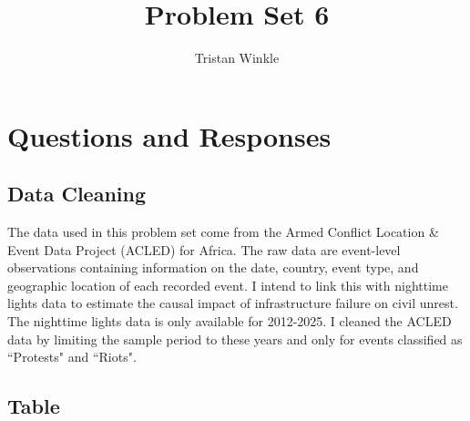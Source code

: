 \documentclass[12pt]{article}
\title{Problem Set 6}
\author{Tristan Winkle}
\date{}
\begin{document}
\maketitle

\section{Questions and Responses}

\subsection*{Data Cleaning}
The data used in this problem set come from the Armed Conflict Location \& Event Data Project (ACLED) for Africa. The raw data are event-level observations containing information on the date, country, event type, and geographic location of each recorded event. I intend to link this with nighttime lights data to estimate the causal impact of infrastructure failure on civil unrest. The nighttime lights data is only available for 2012-2025. I cleaned the ACLED data by limiting the sample period to these years and only for events classified as ``Protests" and ``Riots".

\pagebreak

\subsection*{Table}
\end{document}
